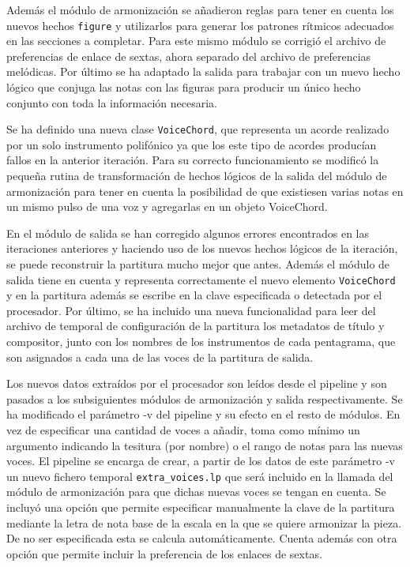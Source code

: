 Además el módulo de armonización se añadieron reglas para tener en cuenta los nuevos hechos \texttt{figure} y utilizarlos para generar los patrones rítmicos adecuados en las secciones a completar. Para este mismo módulo se corrigió el archivo de preferencias de enlace de sextas, ahora separado del archivo de preferencias melódicas. Por último se ha adaptado la salida para trabajar con un nuevo hecho lógico que conjuga las notas con las figuras para producir un único hecho conjunto con toda la información necesaria.

Se ha definido una nueva clase \texttt{VoiceChord}, que representa un acorde realizado por un solo instrumento polifónico ya que los este tipo de acordes producían fallos en la anterior iteración. Para su correcto funcionamiento se modificó la pequeña rutina de transformación de hechos lógicos de la salida del módulo de armonización para tener en cuenta la posibilidad de que existiesen varias notas en un mismo pulso de una voz y agregarlas en un objeto VoiceChord.

En el módulo de salida se han corregido algunos errores encontrados en las iteraciones anteriores y haciendo uso de los nuevos hechos lógicos de la iteración, se puede reconstruir la partitura mucho mejor que antes. Además el módulo de salida tiene en cuenta y representa correctamente el nuevo elemento \texttt{VoiceChord} y en la partitura además se escribe en la clave especificada o detectada por el procesador. Por último, se ha incluido una nueva funcionalidad para leer del archivo de temporal de configuración de la partitura los metadatos de título y compositor, junto con los nombres de los instrumentos de cada pentagrama, que son asignados a cada una de las voces de la partitura de salida.

Los nuevos datos extraídos por el procesador son leídos desde el pipeline y son pasados a los subsiguientes módulos de armonización y salida respectivamente. Se ha modificado el parámetro -v del pipeline y su efecto en el resto de módulos. En vez de especificar una cantidad de voces a añadir, toma como mínimo un argumento indicando la tesitura (por nombre) o el rango de notas para las nuevas voces. El pipeline se encarga de crear, a partir de los datos de este parámetro -v un nuevo fichero temporal \texttt{extra\_voices.lp} que será incluido en la llamada del módulo de armonización para que dichas nuevas voces se tengan en cuenta. Se incluyó una opción que permite especificar manualmente la clave de la partitura mediante la letra de nota base de la escala en la que se quiere armonizar la pieza. De no ser especificada esta se calcula automáticamente. Cuenta además con otra opción que permite incluir la preferencia de los enlaces de sextas.

